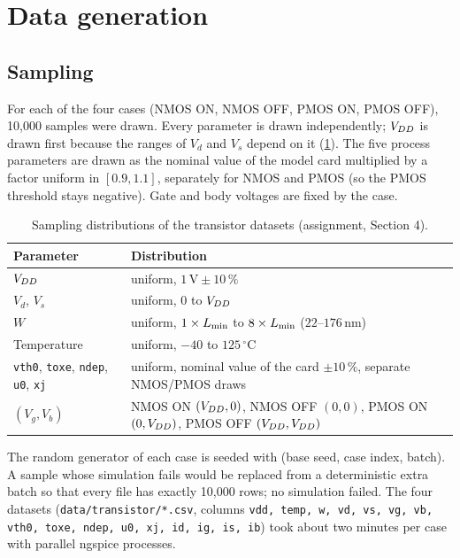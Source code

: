 \section{Data generation}\label{sec:data}

\subsection{Sampling}
For each of the four cases (NMOS ON, NMOS OFF, PMOS ON, PMOS OFF), 10{,}000 samples were drawn. Every parameter is drawn independently;
$V_{DD}$ is drawn first because the ranges of $V_d$ and $V_s$ depend on it (\cref{tab:sampling}). The five process parameters are drawn as the nominal
value of the model card multiplied by a factor uniform in $[0.9, 1.1]$, separately for NMOS and PMOS (so the PMOS threshold stays negative).
Gate and body voltages are fixed by the case.

\begin{table}[H]\centering\small
\begin{tabular}{ll}
\toprule
Parameter & Distribution\\
\midrule
$V_{DD}$ & uniform, $1\,\mathrm{V}\pm10\,\%$\\
$V_d$, $V_s$ & uniform, $0$ to $V_{DD}$\\
$W$ & uniform, $1\times L_{\min}$ to $8\times L_{\min}$ ($22$--$176\,\mathrm{nm}$)\\
Temperature & uniform, $-40$ to $125\,^\circ$C\\
\texttt{vth0}, \texttt{toxe}, \texttt{ndep}, \texttt{u0}, \texttt{xj} & uniform, nominal value of the card $\pm10\,\%$, separate NMOS/PMOS draws\\
$(V_g, V_b)$ & NMOS ON $(V_{DD},0)$, NMOS OFF $(0,0)$, PMOS ON $(0,V_{DD})$, PMOS OFF $(V_{DD},V_{DD})$\\
\bottomrule
\end{tabular}
\caption{Sampling distributions of the transistor datasets (assignment, Section 4).}\label{tab:sampling}
\end{table}

The random generator of each case is seeded with (base seed, case index, batch). A sample whose simulation fails would be replaced from a
deterministic extra batch so that every file has exactly 10{,}000 rows; no simulation failed. The four datasets
(\texttt{data/transistor/*.csv}, columns \texttt{vdd, temp, w, vd, vs, vg, vb, vth0, toxe, ndep, u0, xj, id, ig, is, ib}) took about two minutes
per case with parallel ngspice processes.

